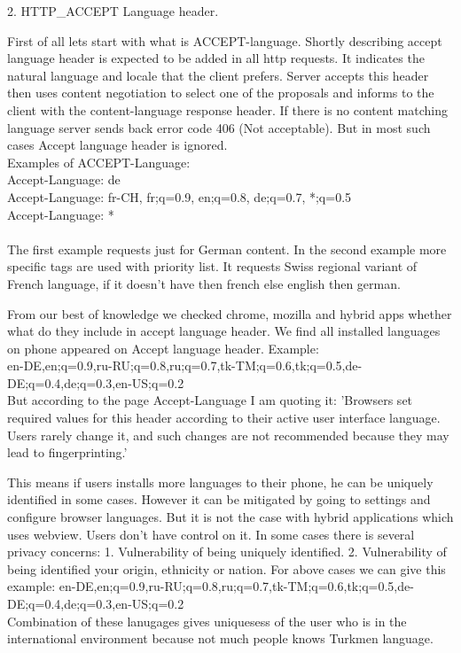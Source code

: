 2. HTTP\_ACCEPT Language header.\par
First of all lets start with what is ACCEPT-language. 
Shortly describing accept language header is expected to be added in all http requests. It indicates the natural language and locale that the client prefers. Server accepts this header then uses content negotiation to select one of the proposals and informs to the client with the content-language response header. 
 If there is no content matching language server sends back error code 406 (Not acceptable). But in most such cases Accept language header is ignored. \\
Examples of ACCEPT-Language:\\
Accept-Language: de\\
Accept-Language: fr-CH, fr;q=0.9, en;q=0.8, de;q=0.7, *;q=0.5\\
Accept-Language: *\\

\\
The first example requests just for German content. In the second example more specific   tags  are used with priority list. It requests Swiss regional variant of French language, if it doesn't have then french else  english then german. 

From our best of knowledge we checked chrome, mozilla and hybrid apps whether what do they include in accept language header. 
We find all installed languages on phone appeared on Accept language header. 
Example:\\
en-DE,en;q=0.9,ru-RU;q=0.8,ru;q=0.7,tk-TM;q=0.6,tk;q=0.5,de-DE;q=0.4,de;q=0.3,en-US;q=0.2\\
But according to the page Accept-Language I am quoting it: 
 'Browsers set required values for this header according to their active user interface language. Users rarely change it, and such changes are not recommended because they may lead to fingerprinting.'

This means if users installs more languages to their phone, he can be uniquely identified in some cases. 
However it can be mitigated by going to settings and configure browser languages. 
But it is not the case with hybrid applications which uses webview.  Users don't have control on it. 
In some cases there is several privacy concerns:
1. Vulnerability of being uniquely identified.
2. Vulnerability of being identified your origin, ethnicity or nation.
For above cases we can give this example:
en-DE,en;q=0.9,ru-RU;q=0.8,ru;q=0.7,tk-TM;q=0.6,tk;q=0.5,de-DE;q=0.4,de;q=0.3,en-US;q=0.2\\
Combination of these lanugages gives uniquesess of the user who is in the international environment because not much people knows Turkmen language.

